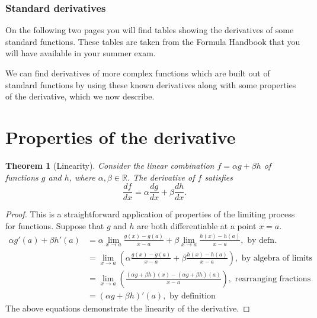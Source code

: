 \documentclass[extrafontsizes, twoside, a4paper]{memoir}
\theoremstyle{plain}%
\newtheorem{thm}{Theorem}[chapter]
\theoremstyle{definition}
\theoremstyle{remark}
\begin{document}
\subsubsection{Standard derivatives}
On the following two pages you will find tables showing the derivatives of some standard functions. These tables are taken from the Formula Handbook that you will have available in your summer exam.



We can find derivatives of more complex functions which are built out of standard functions by using these known derivatives along with some properties of the derivative, which we now describe.

\section{Properties of the derivative}
\begin{thm}[Linearity]
Consider the linear combination $f = \alpha g + \beta h$ of functions $g$ and $h$, where $\alpha, \beta \in \mathbb{R}$. The derivative of $f$ satisfies
$$ \frac{df}{dx} = \alpha \frac{dg}{dx} + \beta \frac{dh}{dx} .$$
\end{thm}
\begin{proof}
This is a straightforward application of properties of the limiting process for functions. Suppose that $g$ and $h$ are both differentiable at a point $x=a$.
\begin{align*}
\alpha g'(a) + \beta h'(a)
&=\alpha \lim_{x \to a} \frac{g(x)-g(a)}{x-a}
+\beta \lim_{x \to a} \frac{h(x)-h(a)}{x-a}, \text{ by defn.}\\
&= \lim_{x \to a} \left ( \alpha \frac{g(x)-g(a)}{x-a} + \beta \frac{h(x) - h(a)}{x-a} \right ), \text{ by algebra of limits}\\
& = \lim_{x \to a} \left ( \frac{(\alpha g+ \beta h)(x) - (\alpha g + \beta h)(a)}{x-a}\right ), \text{ rearranging fractions}\\
&= (\alpha g + \beta h)'(a), \text{ by definition}
\end{align*}
The above equations demonstrate the linearity of the derivative.
\end{proof}
\end{document}

